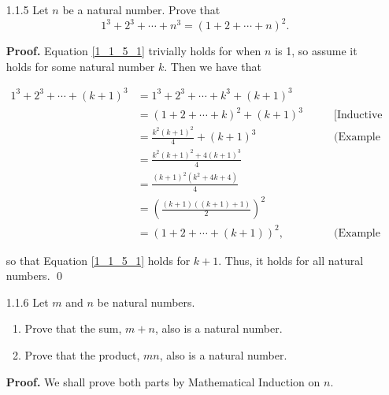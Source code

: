 \begin{enumerate}
      so that Equation \eqref{1_1_4_1} holds for $k + 1$. Thus, it holds for all
      natural numbers. \qed      
   \item[1.1.5]   Let $n$ be a natural number. Prove that
                  \begin{equation}
                     1^3 + 2^3 + \cdots + n^3 = (1 + 2 + \cdots + n)^2.
                     \label{1_1_5_1}
                  \end{equation}

      \textbf{Proof.} Equation \eqref{1_1_5_1} trivially holds for when $n$ is
      1, so assume it holds for some natural number $k$. Then we have that

      \begin{align*}
         1^3 + 2^3 + \cdots + (k + 1)^3 &=
         1^3 + 2^3 + \cdots + k^3 + (k + 1)^3 \\
         &= (1 + 2 + \cdots + k)^2 + (k+1)^3  \qquad
            &\text{[Inductive Hypothesis]} \\
         &= \frac{k^2(k+1)^2}{4} + (k+1)^3 \qquad &\text{(Example 1.1)} \\
         &= \frac{k^2(k+1)^2+4(k+1)^3}{4} \\
         &= \frac{(k+1)^2(k^2 + 4k+4)}{4} \\
         &= \left(\frac{(k+1)((k+1)+1)}{2}\right)^2 \\
         &= (1 + 2 + \cdots + (k+1))^2, \qquad &\text{(Example 1.1)}
      \end{align*}

      so that Equation \eqref{1_1_5_1} holds for $k + 1$. Thus, it holds for all
      natural numbers. \qed
   \item[1.1.6]   Let $m$ and $n$ be natural numbers.
                  \begin{enumerate}
                     \item Prove that the sum, $m + n$, also is a natural 
                           number.
                     \item Prove that the product, $mn$, also is a natural 
                           number.
                  \end{enumerate}

      \textbf{Proof.} We shall prove both parts by Mathematical Induction on
      $n$.


\end{enumerate}
